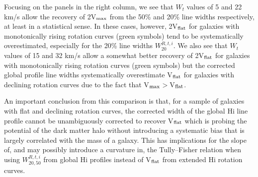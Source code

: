 \documentclass[usenatbib,useAMS]{mnras}
\begin{document}
Focusing on the panels in the right column, we see that $W_{t}$ values
of 5 and 22 km/s allow the recovery of 2V$_{\rm max}$ from the 50\% and
20\% line widths respectively, at least in a statistical sense.  In
these cases, however, 2V$_{\rm flat}$ for galaxies with monotonically
rising rotation curves (green symbols) tend to be systematically
overestimated, especially for the 20\% line widths $W_{20}^{R,t,i}$.  We
also see that $W_{t}$ values of 15 and 32 km/s allow a somewhat better
recovery of 2V$_{\rm flat}$ for galaxies with monotonically rising
rotation curves (green symbols) but the corrected global profile line
widths systematically overestimate V$_{\rm flat}$ for galaxies with
declining rotation curves due to the fact that V$_{\rm max}$$>$V$_{\rm
flat}$. 

An important conclusion from this comparison is that, for a sample of
galaxies with flat and declining rotation curves, the corrected width of
the global H{\sc i} line profile cannot be unambiguously corrected to
recover V$_{\rm flat}$ which is probing the potential of the dark matter
halo without introducing a systematic bias that is largely correlated
with the mass of a galaxy.  This has implications for the slope of, and
may possibly introduce a curvature in, the Tully--Fisher relation when
using $W_{20,50}^{R,t,i}$ from global H{\sc i} profiles instead of
V$_{\rm flat}$ from extended H{\sc i} rotation curves. 
\end{document}
